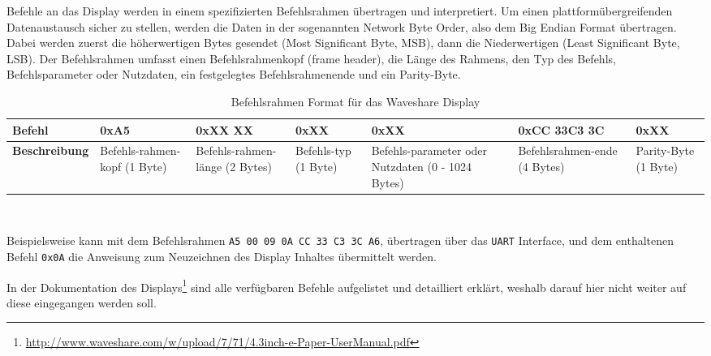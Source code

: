 Befehle an das Display werden in einem spezifizierten Befehlsrahmen übertragen und interpretiert. Um einen plattformübergreifenden Datenaustausch sicher zu stellen, werden die Daten in der sogenannten Network Byte Order, also dem Big Endian Format übertragen. Dabei werden zuerst die höherwertigen Bytes gesendet (Most Significant Byte, MSB), dann die Niederwertigen (Least Significant Byte, LSB).
Der Befehlsrahmen umfasst einen Befehlsrahmenkopf (frame header), die Länge des Rahmens, den Typ des Befehls, Befehlsparameter oder Nutzdaten, ein festgelegtes Befehlsrahmenende und ein Parity-Byte.

\begin{table}[h]
\begin{tabular}{|m{2.7cm}||m{1.6cm}|m{1.9cm}|m{1.6cm}|m{1.9cm}|m{2.7cm}|m{1.4cm}|}
\hline
\textbf{Befehl} & 0xA5 & 0xXX XX & 0xXX & 0xXX & 0xCC 33C3 3C & 0xXX\\
\hline
\textbf{Beschreibung} & Befehls-rahmen-kopf \newline(1 Byte) & Befehls-rahmen-länge \newline(2 Bytes) & Befehls-typ \newline (1 Byte) & Befehls-parameter oder Nutzdaten \newline(0 - 1024 Bytes) & Befehlsrahmen-ende \newline(4 Bytes) & Parity-Byte \newline(1 Byte)\\
\hline
\end{tabular}
\\
\caption{Befehlsrahmen Format für das Waveshare Display} 
\label{tab:Befehlsrahmen}
\end{table}

Beispielsweise kann mit dem Befehlsrahmen \texttt{A5 00 09 0A CC 33 C3 3C A6}, übertragen über das \texttt{UART} Interface, und dem enthaltenen Befehl \texttt{0x0A} die Anweisung zum Neuzeichnen des Display Inhaltes übermittelt werden.

In der Dokumentation des Displays\footnote{\url{http://www.waveshare.com/w/upload/7/71/4.3inch-e-Paper-UserManual.pdf}} sind alle verfügbaren Befehle aufgelistet und detailliert erklärt, weshalb darauf hier nicht weiter auf diese eingegangen werden soll.  
 

